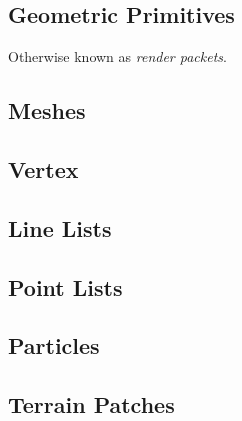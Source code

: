 \documentclass[a4paper,12pt]{book}
\begin{document}
\subsection{Geometric Primitives}

Otherwise known as \textit{render packets}.

\subsection{Meshes}

\subsection{Vertex}

\subsection{Line Lists}

\subsection{Point Lists}

\subsection{Particles}

\subsection{Terrain Patches}
\end{document}
